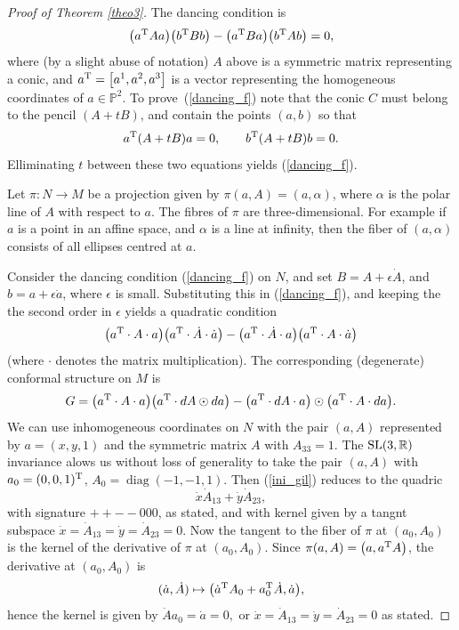 \documentclass[pdftex]{sigma}%
\numberwithin{equation}{section}
\newcommand{\PP}{\mathbb{P}}
\newcommand{\R}{\mathbb{R}}
\def\be{\begin{equation}}
\def\ee{\end{equation}}
\begin{document}
\begin{proof}[Proof of Theorem \ref{theo3}]
The dancing condition
is
\be\label{dancing_f}
\big(a^{\rm T} A a\big)\big(b^{\rm T}B b\big)-\big(a^{\rm T}Ba\big)\big(b^{\rm T} A b\big)=0,
\ee
where (by a slight abuse of notation) $A$ above is a symmetric matrix
representing a conic, and $a^{\rm T}=\big[a^1, a^2, a^3\big]$ is a vector representing the homogeneous coordinates of $a\in\PP^2$. To prove~(\ref{dancing_f}) note that the
conic $C$ must belong to the pencil $(A+tB)$, and contain the points $(a, b)$ so that
\[
a^{\rm T}(A+tB)a=0, \qquad b^{\rm T}(A+tB)b=0.
\]
Elliminating $t$ between these two equations yields (\ref{dancing_f}).

Let $\pi\colon N\rightarrow M$ be a projection given by $\pi(a, A)=(a, \alpha)$,
where $\alpha$ is the polar line of $A$ with respect to $a$.
The fibres of $\pi$ are three-dimensional. For example
if $a$ is a point in an affine space, and $\alpha$ is a line at infinity, then the fiber
of $(a, \alpha)$ consists of all ellipses centred at $a$.

Consider the dancing condition (\ref{dancing_f}) on $N$, and
set $B=A+\epsilon\dot{A}$, and $b=a+\epsilon\dot{a}$, where $\epsilon$ is
small. Substituting this in (\ref{dancing_f}), and keeping the
the second order in $\epsilon$ yields a quadratic condition
\be
\label{ini_gil}
\big(a^{\rm T}\cdot A\cdot a\big)\big(a^{\rm T}\cdot\dot{A}\cdot\dot{a}\big)-\big(a^{\rm T}\cdot\dot{A}\cdot a\big)\big(a^{\rm T}\cdot A\cdot \dot{a}\big)
\ee
(where $\cdot$ denotes the matrix multiplication). The corresponding (degenerate) conformal
structure on $M$ is
\[
G=\big(a^{\rm T}\cdot A\cdot a\big)\big(a^{\rm T}\cdot d{A}\odot d{a}\big)-\big(a^{\rm T}\cdot d{A}\cdot a\big)\odot \big(a^{\rm T}\cdot A\cdot d{a}\big).
\]
We can use inhomogeneous coordinates on $N$ with the pair
$(a, A)$ represented by $a=(x, y, 1)$ and the symmetric matrix $A$ with
$A_{33}=1$. The ${\rm SL}(3, \R)$ invariance alows us without loss of generality to take
the pair $(a, A)$ with $ a_0=(0,0,1)^{\rm T}$, $A_0=\operatorname{diag}(-1,-1,1)$. Then (\ref{ini_gil}) reduces to the quadric
\[
\dot x {\dot A}_{13}+\dot y {\dot A}_{23},
\]
with signature $++--000$, as stated, and
with kernel given by a tangnt subspace
 $\dot x={\dot A}_{13}=\dot y= {\dot A}_{23}=0$.
Now the tangent to the fiber of $\pi$ at $(a_0, A_0)$
is the kernel of the derivative of $\pi$ at $(a_0,A_0)$.
Since $\pi(a, A)=\big(a,a^{\rm T}A\big)$, the derivative at $(a_0, A_0)$
is \[(\dot a,\dot A)
\mapsto \big(\dot a^{\rm T} A_0+ a_0^{\rm T}\dot A, \dot a\big),\]
hence the kernel is given by $\dot Aa_0=\dot a=0,$ or $\dot x={\dot A}_{13}=\dot y= {\dot A}_{23}=0$ as stated.
\end{proof}
\end{document}
